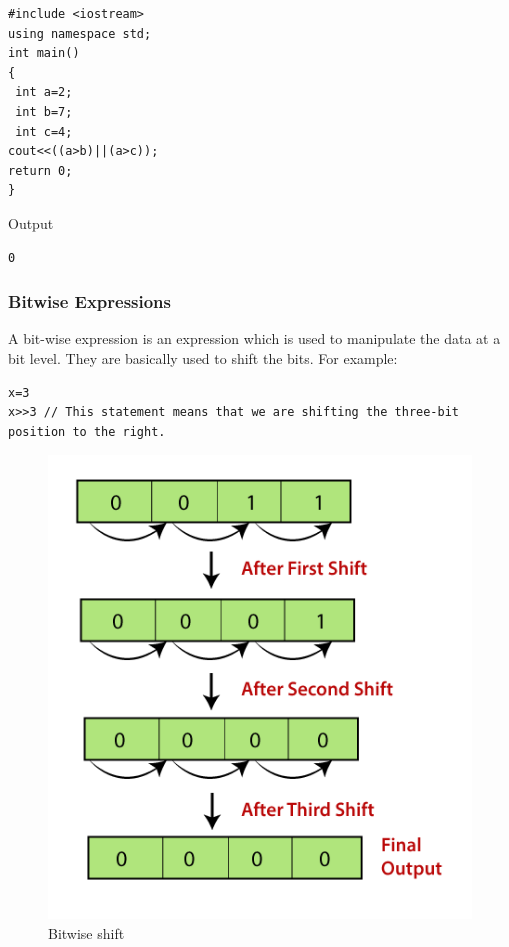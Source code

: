 \documentclass{book}
\begin{document}
\begin{lstlisting}
#include <iostream>  
using namespace std;  
int main()  
{  
 int a=2;  
 int b=7;  
 int c=4;  
cout<<((a>b)||(a>c));  
return 0;  
}  
\end{lstlisting}

Output

\begin{Verbatim}
0
\end{Verbatim}

\subsubsection{Bitwise Expressions}

A bit-wise expression is an expression which is used to manipulate the data at a bit level. They are basically used to shift the bits. For example:

\begin{lstlisting}
x=3
x>>3 // This statement means that we are shifting the three-bit position to the right.
\end{lstlisting}

\begin{figure}[h]
\centering 
\includegraphics[scale=0.4]{bitwise}%
\caption{Bitwise shift}%
\label{}%
\end{figure}
\end{document}
